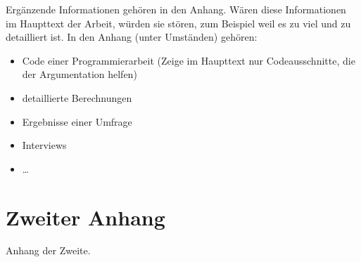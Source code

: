 \documentclass[a4paper,12pt,twoside]{article}
\begin{document}
Ergänzende Informationen gehören in den Anhang. Wären diese Informationen im Haupttext der Arbeit, würden sie stören, zum Beispiel weil es zu viel und zu detailliert ist. In den Anhang (unter Umständen) gehören:
\begin{itemize}
	\item Code einer Programmierarbeit (Zeige im Haupttext nur Codeausschnitte, die der Argumentation helfen)
	\item detaillierte Berechnungen
	\item Ergebnisse einer Umfrage
	\item Interviews
	\item \ldots
\end{itemize}


\newpage

\section{Zweiter Anhang}

Anhang der Zweite.





\newpage

\clearpage



\newpage
{} %
\listoffigures %
\end{document}
